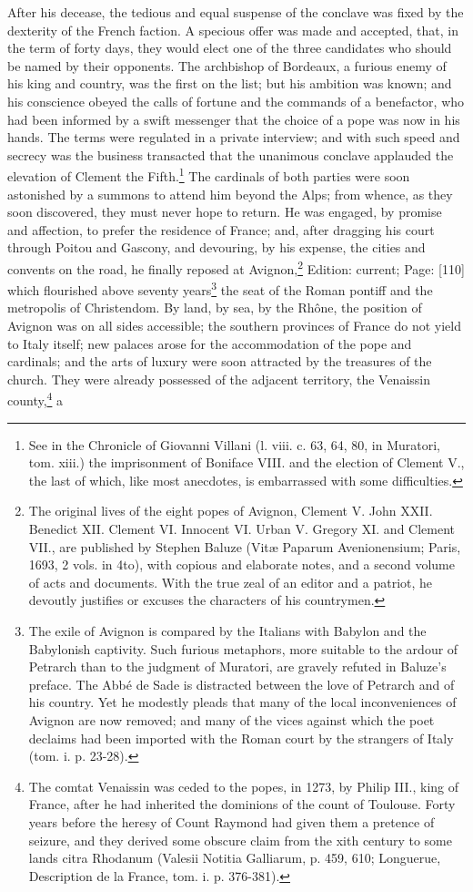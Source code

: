 After his decease, the tedious and equal suspense of the conclave was fixed by the dexterity of the French faction. A specious offer was made and accepted, that, in the term of forty days, they would elect one of the three candidates who should be named by their opponents. The archbishop of Bordeaux, a furious enemy of his king and country, was the first on the list; but his ambition was known; and his conscience obeyed the calls of fortune and the commands of a benefactor, who had been informed by a swift messenger that the choice of a pope was now in his hands. The terms were regulated in a private interview; and with such speed and secrecy was the business transacted that the unanimous conclave applauded the elevation of Clement the Fifth.\footnote{See in the Chronicle of Giovanni Villani (l. viii. c. 63, 64, 80, in Muratori, tom. xiii.) the imprisonment of Boniface VIII. and the election of Clement V., the last of which, like most anecdotes, is embarrassed with some difficulties.} The cardinals of both parties were soon astonished by a summons to attend him beyond the Alps; from whence, as they soon discovered, they must never hope to return. He was engaged, by promise and affection, to prefer the residence of France; and, after dragging his court through Poitou and Gascony, and devouring, by his expense, the cities and convents on the road, he finally reposed at Avignon,\footnote{The original lives of the eight popes of Avignon, Clement V. John XXII. Benedict XII. Clement VI. Innocent VI. Urban V. Gregory XI. and Clement VII., are published by Stephen Baluze (Vitæ Paparum Avenionensium; Paris, 1693, 2 vols. in 4to), with copious and elaborate notes, and a second volume of acts and documents. With the true zeal of an editor and a patriot, he devoutly justifies or excuses the characters of his countrymen.} Edition: current; Page: [110] which flourished above seventy years\footnote{The exile of Avignon is compared by the Italians with Babylon and the Babylonish captivity. Such furious metaphors, more suitable to the ardour of Petrarch than to the judgment of Muratori, are gravely refuted in Baluze\texthebrew{}’s preface. The Abbé de Sade is distracted between the love of Petrarch and of his country. Yet he modestly pleads that many of the local inconveniences of Avignon are now removed; and many of the vices against which the poet declaims had been imported with the Roman court by the strangers of Italy (tom. i. p. 23-28).} the seat of the Roman pontiff and the metropolis of Christendom. By land, by sea, by the Rhône, the position of Avignon was on all sides accessible; the southern provinces of France do not yield to Italy itself; new palaces arose for the accommodation of the pope and cardinals; and the arts of luxury were soon attracted by the treasures of the church. They were already possessed of the adjacent territory, the Venaissin county,\footnote{The comtat Venaissin was ceded to the popes, in 1273, by Philip III., king of France, after he had inherited the dominions of the count of Toulouse. Forty years before the heresy of Count Raymond had given them a pretence of seizure, and they derived some obscure claim from the xith century to some lands citra Rhodanum (Valesii Notitia Galliarum, p. 459, 610; Longuerue, Description de la France, tom. i. p. 376-381).} a 